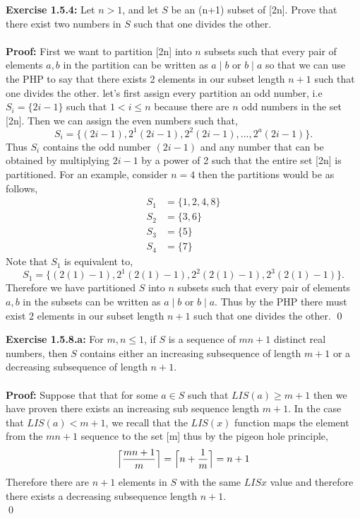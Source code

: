 \documentclass{amsart}
\begin{document}
\noindent\textbf{Exercise 1.5.4: } Let $n > 1$, and let $S$ be an (n+1) subset of [2n]. Prove that there exist two numbers in $S$ such that one divides the other.\\\\
\noindent \textbf{Proof:} First we want to partition [2n] into $n$ subsets such that every pair of elements $a,b$ in the partition can be written as $a\mid b$ or $b \mid a$ so that we can use the PHP to say that there exists 2 elements in our subset length $n+1$ such that one divides the other.  let's first assign every partition an odd number, i.e $S_i=\{2i-1\}$ such that $1<i\leq n$ because there are $n$ odd numbers in the set [2n]. Then we can assign the even numbers such that, 
\begin{equation}
 S_i=\{(2i-1),2^{1}(2i-1),2^{2}(2i-1),...,2^{a}(2i-1)\}. 
\end{equation} 
Thus $S_i$ contains the odd number $(2i-1)$ and any number that can be
obtained by multiplying $2i-1$ by a power of 2 such that the entire set [2n] is partitioned. For an example, consider $n=4$ then the partitions would be as follows,
\begin{align}
S_1&=\{1,2,4,8\}\\
S_2&=\{3,6\}\\
S_3&=\{5\}\\
S_4&=\{7\}
\end{align}
Note that $S_1$ is equivalent to,
\begin{equation}
 S_1=\{(2(1)-1),2^{1}(2(1)-1),2^{2}(2(1)-1),2^{3}(2(1)-1)\}. 
\end{equation} 
Therefore we have partitioned $S$ into $n$ subsets such that every pair of elements $a,b$ in the subsets can be written as $a\mid b$ or $b \mid a$. Thus by the PHP there must exist 2 elements in our subset length $n+1$ such that one divides the other.
\qed
\vspace{1in}

\noindent\textbf{Exercise 1.5.8.a: } For $m,n \leq 1$, if $S$ is a sequence of $mn+1$ distinct real numbers, then $S$ contains either an increasing subsequence of length $m+1$ or a decreasing subsequence of length $n+1$.\\\\
\noindent \textbf{Proof:} Suppose that that for some $a\in S$ such that $LIS(a)\geq m+1$ then we have proven there exists an increasing sub sequence length $m+1$. In the case that $LIS(a) < m+1$, we recall that the $LIS(x)$ function maps the element from the $mn+1$ sequence to the set [m] thus by the pigeon hole principle,
\begin{equation}
\Bigl\lceil \frac{mn+1}{m} \Bigr\rceil =\Bigl\lceil n + \frac{1}{m} \Bigr\rceil = n+1
\end{equation}
Therefore there are $n+1$ elements in $S$ with the same $LIS{x}$ value and therefore there exists a decreasing subsequence length $n+1$.\\
\qed\\
\end{document}

